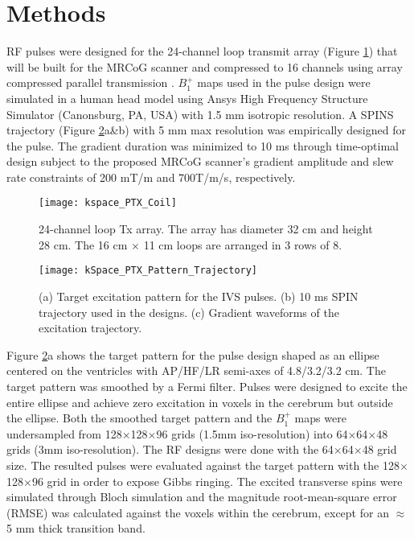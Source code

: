 \section*{Methods}
RF pulses were designed for the 24-channel loop transmit array (Figure \ref{fig:Coil}) that will be built for the MRCoG scanner  and compressed to 16 channels using array compressed parallel transmission \cite{cao2016array}. $B_1^+$ maps used in the pulse design were simulated in a human head model using Ansys High Frequency Structure Simulator (Canonsburg, PA, USA) with 1.5 mm isotropic resolution. A SPINS  trajectory \cite{malik2012tailored} (Figure \ref{fig:Target}a\&b) with 5 mm max resolution was empirically designed for the pulse. The gradient duration was minimized to 10 ms through time-optimal design \cite{lustig2008fast} subject to the proposed MRCoG scanner’s gradient amplitude and slew rate constraints of 200 mT/m and 700T/m/s, respectively. 

\begin{figure}
	\centering
	\texttt{[image: kspace\_PTX\_Coil]}
	\caption{24-channel loop Tx array. The array has diameter 32 cm and height 28 cm. The 16 cm $\times$ 11 cm loops are arranged in 3 rows of 8.}
	\label{fig:Coil}
\end{figure}



\begin{figure}
	\centering
	\texttt{[image: kSpace\_PTX\_Pattern\_Trajectory]}
	\caption{(a) Target excitation pattern for the IVS pulses. (b) 10 ms SPIN trajectory used in the designs. (c) Gradient waveforms of the excitation trajectory.}
	\label{fig:Target}
\end{figure}
Figure \ref{fig:Target}a shows the target pattern for the pulse design shaped as an ellipse centered on the ventricles with AP/HF/LR semi-axes of 4.8/3.2/3.2 cm. The target pattern was smoothed by a Fermi filter. Pulses were designed to excite the entire ellipse and achieve zero excitation in voxels in the cerebrum but outside the ellipse. Both the smoothed target pattern and the $B_1^+$ maps were undersampled from 128$\times$128$\times$96 grids (1.5mm iso-resolution) into 64$\times$64$\times$48 grids (3mm iso-resolution). The RF designs were done with the 64$\times$64$\times$48 grid size. The resulted pulses were evaluated against the target pattern with the 128$\times$128$\times$96 grid in order to expose Gibbs ringing. The excited transverse spins were simulated through Bloch simulation and the magnitude root-mean-square error (RMSE) was calculated against the voxels within the cerebrum, except for an $\approx$5 mm thick transition band.

